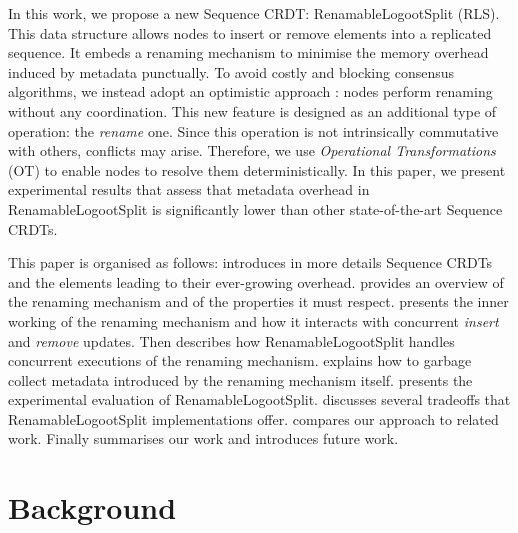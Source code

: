 \documentclass[10pt,journal,compsoc]{IEEEtran}
\begin{document}
In this work, we propose a new Sequence \ac{CRDT}: RenamableLogootSplit (RLS).
This data structure allows nodes to insert or remove elements into a replicated sequence.
It embeds a renaming mechanism to minimise the memory overhead induced by metadata punctually.
To avoid costly and blocking consensus algorithms, we instead adopt an optimistic approach : nodes perform renaming without any coordination.
This new feature is designed as an additional type of operation: the \emph{rename} one.
Since this operation is not intrinsically commutative with others, conflicts may arise.
Therefore, we use \emph{Operational Transformations} (OT) \cite{10.1145/67544.66963,10.1145/289444.289469,4668339} to enable nodes to resolve them deterministically.
In this paper, we present experimental results that assess that metadata overhead in RenamableLogootSplit is significantly lower than other state-of-the-art Sequence \acp{CRDT}.

This paper is organised as follows:
 introduces in more details Sequence \acp{CRDT} and the elements leading to their ever-growing overhead.
 provides an overview of the renaming mechanism and of the properties it must respect.
 presents the inner working of the renaming mechanism and how it interacts with concurrent \emph{insert} and \emph{remove} updates.
Then  describes how RenamableLogootSplit handles concurrent executions of the renaming mechanism.
 explains how to garbage collect metadata introduced by the renaming mechanism itself.
 presents the experimental evaluation of RenamableLogootSplit.
 discusses several tradeoffs that RenamableLogootSplit implementations offer.
 compares our approach to related work.
Finally  summarises our work and introduces future work.


\section{Background}
\label{sec:background}
\end{document}

